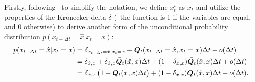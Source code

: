 Firstly, following~\cite{CFG_DDM:journals/corr/abs-2406-01572} to simplify the notation, we define $x_t^i$ as $x_t$ and utilize the properties of the Kronecker delta $\delta$ (\ie~the function is 1 if the variables are equal, and 0 otherwise) to derive another form of the unconditional probability distribution $p({x}_{t- \Delta t}=\hat{x}|x_t=x)$:
\begin{equation}
\label{eq:upd_form}
\begin{aligned}
    p ( x_{t-\Delta t} = \hat{x} | x_{t} = x ) & = \delta_{{x}_{t- \Delta t}=\hat{x}, x_t=x} + \bar{{\bm{Q}}}_t({x}_{t- \Delta t}=\hat{x},x_t=x)\Delta t + o(\Delta t) \\
    & = \delta_{\hat{x}, x} + \delta_{\hat{x}, x}\bar{{\bm{Q}}}_t(\hat{x},x)\Delta t + (1-\delta_{\hat{x}, x})\bar{{\bm{Q}}}_t(\hat{x},x)\Delta t + o(\Delta t) \\
    & = \delta_{\hat{x}, x}\left(1+\bar{{\bm{Q}}}_t(x,x)\Delta t \right) + (1-\delta_{\hat{x}, x})\bar{{\bm{Q}}}_t(\hat{x},x)\Delta t + o(\Delta t).
\end{aligned}    
\end{equation}

